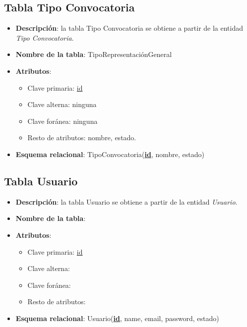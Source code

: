 \subsection{Tabla Tipo Convocatoria}
    \begin{itemize}
        \item \textbf{Descripción}: la tabla Tipo Convocatoria se obtiene a partir de la entidad \textit{Tipo Convocatoria}.
        \item \textbf{Nombre de la tabla}: TipoRepresentaciónGeneral
        \item \textbf{Atributos}:
            \begin{itemize}
                \item Clave primaria: \underline{id}
                \item Clave alterna: ninguna
                \item Clave foránea: ninguna
                \item Resto de atributos: nombre, estado.
            \end{itemize}
        \item \textbf{Esquema relacional}: 
            TipoConvocatoria(\textbf{\underline{id}}, nombre, estado)
    \end{itemize}

\subsection{Tabla Usuario}
    \begin{itemize}
        \item \textbf{Descripción}: la tabla Usuario se obtiene a partir de la entidad \textit{Usuario}.
        \item \textbf{Nombre de la tabla}:
        \item \textbf{Atributos}:
            \begin{itemize}
                \item Clave primaria: \underline{id}
                \item Clave alterna: 
                \item Clave foránea: \textbf{}
                \item Resto de atributos: 
            \end{itemize}
        \item \textbf{Esquema relacional}: 
            Usuario(\textbf{\underline{id}}, name, email, password, estado)
    \end{itemize}

